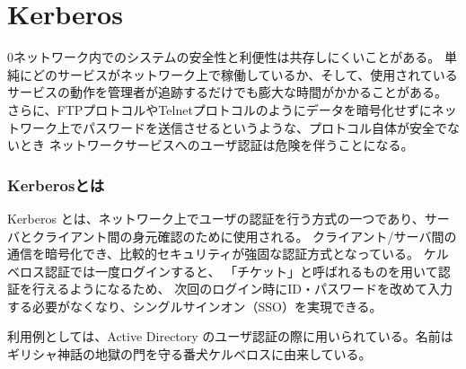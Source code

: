 \documentclass[11pt,a4j,titlepage]{jreport}
\begin{document}

\section{Kerberos}
\if0ネットワーク内でのシステムの安全性と利便性は共存しにくいことがある。
単純にどのサービスがネットワーク上で稼働しているか、そして、使用されているサービスの動作を管理者が追跡するだけでも膨大な時間がかかることがある。
さらに、FTPプロトコルやTelnetプロトコルのようにデータを暗号化せずにネットワーク上でパスワードを送信させるというような、プロトコル自体が安全でないとき
ネットワークサービスへのユーザ認証は危険を伴うことになる。
\fi

\subsubsection*{Kerberosとは}
Kerberos \cite{RFC4120}とは、ネットワーク上でユーザの認証を行う方式の一つであり、サーバとクライアント間の身元確認のために使用される。
クライアント/サーバ間の通信を暗号化でき、比較的セキュリティが強固な認証方式となっている。
ケルベロス認証では一度ログインすると、
「チケット」と呼ばれるものを用いて認証を行えるようになるため、
次回のログイン時にID・パスワードを改めて入力する必要がなくなり、シングルサインオン（SSO）を実現できる。\par 
利用例としては、Active Directory のユーザ認証の際に用いられている。名前はギリシャ神話の地獄の門を守る番犬ケルベロスに由来している。
\end{document}
